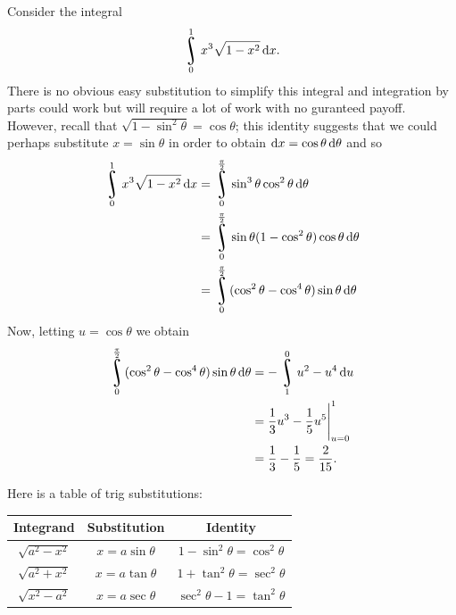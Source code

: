 


Consider the integral
\begin{displaymath}
  \rint^1_0 x^3 \sqrt{1-x^2} \dif{x}.
\end{displaymath}
There is no obvious easy substitution to simplify this integral and integration by parts could work but will require
a lot of work with no guranteed payoff. However, recall that $ \sqrt{1 - \sin^2 \theta} = \cos \theta $; this identity
suggests that we could perhaps substitute $ x = \sin \theta $ in order to obtain $ \dif{x} = \cos \theta \dif{\theta} $ and so
\begin{displaymath}
  \begin{aligned}
    \rint^1_0 x^3 \sqrt{1-x^2} \dif{x} &= \rint^{\frac{\pi}{2}}_0 \sin^3 \theta \cos^2 \theta \dif{\theta}\\
                                      &= \rint^{\frac{\pi}{2}}_0 \sin \theta (1-\cos^2 \theta)\cos \theta \dif{\theta}\\
                                      &= \rint^{\frac{\pi}{2}}_0 (\cos^2 \theta - \cos^4 \theta) \sin \theta \dif{\theta}
  \end{aligned}
\end{displaymath}
Now, letting $ u = \cos \theta $ we obtain
\begin{displaymath}
  \begin{aligned}
    \rint^{\frac{\pi}{2}}_0 (\cos^2 \theta - \cos^4 \theta) \sin \theta \dif{\theta} &= -\rint^{0}_{1} u^2 - u^4 \dif{u}\\
                                                                                    &= \eval{\frac{1}{3}u^3 - \frac{1}{5}u^5}_{u = 0}^{1}\\
                                                                                    &= \frac{1}{3}-\frac{1}{5} = \frac{2}{15}.
  \end{aligned}
\end{displaymath}

Here is a table of trig substitutions:

\begin{center}
\begin{tabular}{|c|c|c|}\hline
  \textbf{Integrand} & \textbf{Substitution} & \textbf{Identity}\\\hline
  $ \sqrt{a^2 - x^2} $ & $ x = a \sin \theta $ & $ 1 - \sin^2 \theta = \cos^2 \theta $\\\hline
  $ \sqrt{a^2 + x^2} $ & $ x = a \tan \theta $ & $ 1 + \tan^2 \theta = \sec^2 \theta $\\\hline
  $ \sqrt{x^2 - a^2} $ & $ x = a \sec \theta $ & $ \sec^2 \theta - 1 = \tan^2 \theta $\\\hline
\end{tabular}
\end{center}


